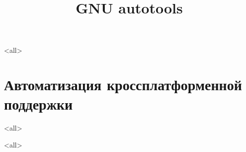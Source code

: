 
\mode<all>{}

\title[Toolchain]{GNU autotools}


\begin{frame}
	\frametitle{}
	\titlepage
	\vspace{-0.5cm}
	\begin{center}
	\end{center}
\end{frame}

\begin{frame}
	\tableofcontents
\end{frame}




\section{Автоматизация кроссплатформенной поддержки}

\mode<all>{}

\mode<all>

